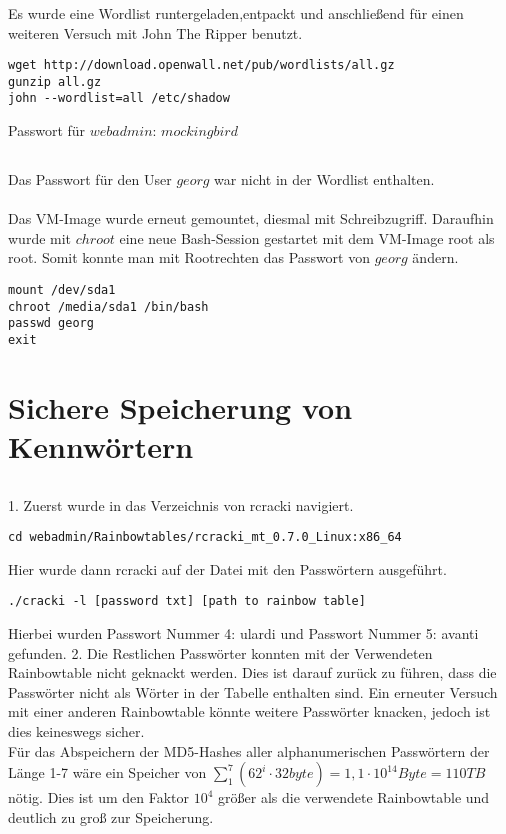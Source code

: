 \documentclass[12pt]{article}
\theoremstyle{plain}
\begin{document}
\subsubsection{}
Es wurde eine Wordlist runtergeladen,entpackt und anschließend für einen weiteren Versuch mit John The Ripper benutzt.
\begin{lstlisting}
wget http://download.openwall.net/pub/wordlists/all.gz
gunzip all.gz
john --wordlist=all /etc/shadow
\end{lstlisting}
Passwort für $webadmin$: $mockingbird$
\subsection{}
Das Passwort für den User $georg$ war nicht in der Wordlist enthalten. \\ \\
Das VM-Image wurde erneut gemountet, diesmal mit Schreibzugriff. Daraufhin wurde mit $chroot$ eine neue Bash-Session gestartet mit dem VM-Image root als root. Somit konnte man mit Rootrechten das Passwort von $georg$ ändern.
\begin{lstlisting}
mount /dev/sda1
chroot /media/sda1 /bin/bash
passwd georg
exit
\end{lstlisting}
\section{Sichere Speicherung von Kennwörtern}
\subsection{}
1.	Zuerst wurde in das Verzeichnis von rcracki navigiert.
\begin{lstlisting}
cd webadmin/Rainbowtables/rcracki_mt_0.7.0_Linux:x86_64
\end{lstlisting}
Hier wurde dann rcracki auf der Datei mit den Passwörtern ausgeführt.
\begin{lstlisting}
./cracki -l [password txt] [path to rainbow table]
\end{lstlisting}
Hierbei wurden Passwort Nummer 4: ulardi und Passwort Nummer 5: avanti gefunden.
2.	Die Restlichen Passwörter konnten mit der Verwendeten Rainbowtable nicht geknackt werden. Dies ist darauf zurück zu führen, dass die Passwörter nicht als Wörter in der Tabelle enthalten sind. Ein erneuter Versuch mit einer anderen Rainbowtable könnte weitere Passwörter knacken, jedoch ist dies keineswegs sicher.\\
Für das Abspeichern der MD5-Hashes aller alphanumerischen Passwörtern der Länge 1-7 wäre ein Speicher von $\sum_1^7 (62^i \cdot 32 byte) = 1,1 \cdot 10^{14} Byte = 110 TB$ nötig. Dies ist um den Faktor $10^4$ größer als die verwendete Rainbowtable und deutlich zu groß zur Speicherung.
\end{document}
